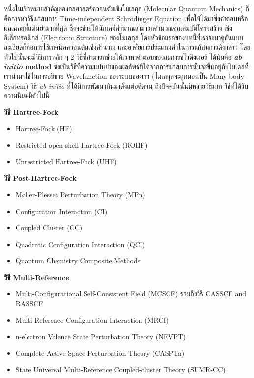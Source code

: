 หนึ่งในเป้าหมายสำคัญของกลศาสตร์ควอนตัมเชิงโมเลกุล (Molecular Quantum Mechanics) ก็คือการหาวิธีแก้สมการ Time-independent
Schr\"{o}dinger Equation เพื่อให้ได้มาซึ่งคำตอบหรือผลเฉลยที่แม่นยำมากที่สุด ซึ่งจะช่วยให้นักเคมีคำนวณสามารถคำนวณคุณสมบัติโครงสร้าง%
เชิงอิเล็กทรอนิกส์ (Electronic Structure) ของโมเลกุล โดยหัวข้อแรกของบทนี้ที่เราจะมาดูกันแบบละเอียดก็คือการใช้เทคนิคควอนตัมเชิงคำนวณ%
และอาศัยการประมาณค่าในการแก้สมการดังกล่าว โดยทั่วไปนั้นจะมีวิธีการหลัก ๆ 2 วิธีที่สามารถช่วยให้เราหาคำตอบของสมการชโรดิงเงอร์ ได้นั่นคือ
\textbf{\textit{ab initio} method} ซึ่งเป็นวิธีที่ความแม่นยำของผลลัพธ์ที่ได้จากการแก้สมการนั้นจะขึ้นอยู่กับโมเดลที่เรานำมาใช้ในการอธิบาย
Wavefunction ของระบบของเรา (โมเลกุลจะถูกมองเป็น Many-body System) วิธี \textit{ab initio} ที่ได้มีการพัฒนากันมาตั้งแต่อดีตจน%
ถึงปัจจุบันนั้นมีหลายวิธีมาก\autocite{friesner2005,helgaker2014,jensen2017} วิธีทีได้รับความนิยมมีดังไปนี้

\noindent \textbf{วิธี Hartree-Fock}
\begin{itemize}[topsep=0pt,noitemsep]\setlength\itemsep{0.5em}
    \item Hartree-Fock (HF)
    \item Restricted open-shell Hartree-Fock (ROHF)
    \item Unrestricted Hartree-Fock (UHF)
\end{itemize}

\noindent \textbf{วิธี Post-Hartree-Fock}
\begin{itemize}[topsep=0pt,noitemsep]\setlength\itemsep{0.5em}
    \item Møller-Plesset Perturbation Theory (MPn)
    \item Configuration Interaction (CI)
    \item Coupled Cluster (CC)
    \item Quadratic Configuration Interaction (QCI)
    \item Quantum Chemistry Composite Methods
\end{itemize}

\noindent \textbf{วิธี Multi-Reference}
\begin{itemize}[topsep=0pt,noitemsep]\setlength\itemsep{0.5em}
    \item Multi-Configurational Self-Consistent Field (MCSCF) รวมถึงวิธี CASSCF and RASSCF
    \item Multi-Reference Configuration Interaction (MRCI)
    \item n-electron Valence State Perturbation Theory (NEVPT)
    \item Complete Active Space Perturbation Theory (CASPTn)
    \item State Universal Multi-Reference Coupled-cluster Theory (SUMR-CC)
\end{itemize}

